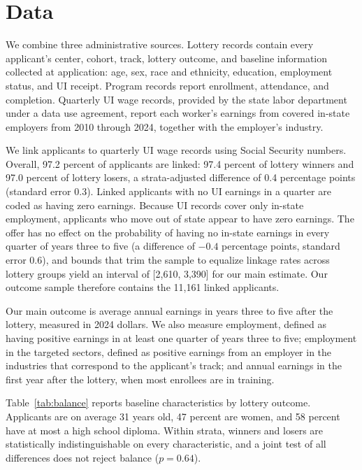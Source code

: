\documentclass[12pt]{article}
\begin{document}
\section{Data}\label{sec:data}

We combine three administrative sources. Lottery records contain every applicant's center, cohort, track, lottery outcome, and baseline information collected at application: age, sex, race and ethnicity, education, employment status, and UI receipt. Program records report enrollment, attendance, and completion. Quarterly UI wage records, provided by the state labor department under a data use agreement, report each worker's earnings from covered in-state employers from 2010 through 2024, together with the employer's industry.

We link applicants to quarterly UI wage records using Social Security numbers. Overall, 97.2 percent of applicants are linked: 97.4 percent of lottery winners and 97.0 percent of lottery losers, a strata-adjusted difference of 0.4 percentage points (standard error 0.3). Linked applicants with no UI earnings in a quarter are coded as having zero earnings. Because UI records cover only in-state employment, applicants who move out of state appear to have zero earnings. The offer has no effect on the probability of having no in-state earnings in every quarter of years three to five (a difference of $-0.4$ percentage points, standard error 0.6), and bounds that trim the sample to equalize linkage rates across lottery groups \citep{lee2009} yield an interval of [2,610, 3,390] for our main estimate. Our outcome sample therefore contains the 11,161 linked applicants.

Our main outcome is average annual earnings in years three to five after the lottery, measured in 2024 dollars. We also measure employment, defined as having positive earnings in at least one quarter of years three to five; employment in the targeted sectors, defined as positive earnings from an employer in the industries that correspond to the applicant's track; and annual earnings in the first year after the lottery, when most enrollees are in training.

Table~\ref{tab:balance} reports baseline characteristics by lottery outcome. Applicants are on average 31 years old, 47 percent are women, and 58 percent have at most a high school diploma. Within strata, winners and losers are statistically indistinguishable on every characteristic, and a joint test of all differences does not reject balance ($p = 0.64$).
\end{document}
